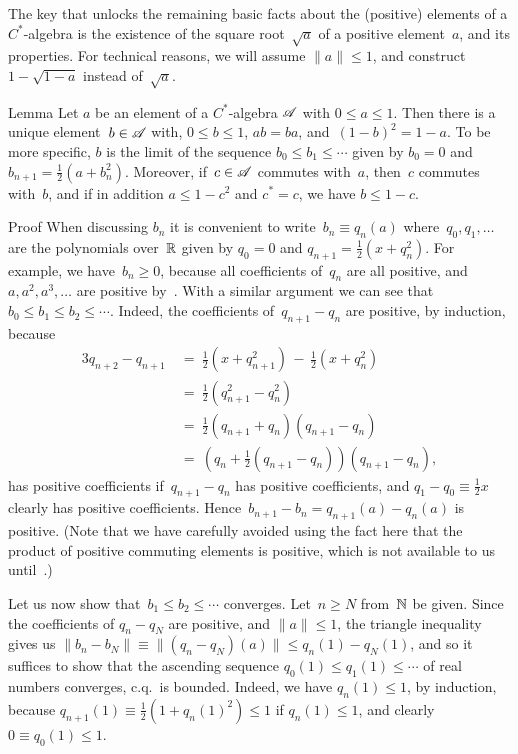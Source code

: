 \documentclass[main]{subfiles}
\begin{document}
\begin{parsec}%
\begin{point}%
The key that unlocks the remaining basic facts 
about the (positive) elements of a  $C^*$-algebra
is the existence of the square root~$\sqrt{a}$ of a positive element~$a$,
and its properties.
For technical reasons,
we will assume $\|a\|\leq 1$,
and construct
 $1-\sqrt{1-a}$ instead of~$\sqrt{a}$.
\end{point}
\begin{point}{Lemma}%
Let $a$ be an element of a $C^*$-algebra $\mathscr{A}$
with $0\leq a\leq 1$.
Then there is a unique element~$b\in\mathscr{A}$ 
with, $0\leq b\leq 1$,
$ab=ba$,
and~$(1-b)^2 = 1-a$.
To be more specific,
$b$ is the limit of
the sequence $b_0\leq b_1\leq \dotsb$
given by $b_0=0$ and $b_{n+1} = \frac{1}{2}(a+b_n^2)$.
Moreover,
if~$c\in\mathscr{A}$ commutes with~$a$, then~$c$ commutes with~$b$,
and if in addition $a\leq 1-c^2$ and $c^*=c$,
we have $b\leq 1-c$.
\begin{point}{Proof}%
When discussing $b_n$ it 
is convenient to write~$b_n \equiv q_n(a)$
where~$q_0,q_1,\dotsc$ are the polynomials over~$\mathbb{R}$ given by
$q_0=0$ and $q_{n+1}=\frac{1}{2}(x + q_n^2)$.
For example,
we have~$b_n\geq 0$, 
because all coefficients of~$q_n$ are all positive,
and $a,a^2,a^3,\dotsc$ are positive by~.
With a similar argument we can see that
 $b_0 \leq b_1\leq b_2\leq \dotsb$.
Indeed, 
the coefficients of~$q_{n+1}-q_n$
are positive,
by induction,
because
\begin{alignat*}{3}
q_{n+2}-q_{n+1} \ &=\ \textstyle \frac{1}{2}(x+ q_{n+1}^2)
\,-\, \textstyle\frac{1}{2}(x+q_n^2) \\
&=\ \textstyle\frac{1}{2}(q_{n+1}^2- q_n^2) \\
&=\ \textstyle\frac{1}{2}(q_{n+1}+q_n)(q_{n+1}-q_n) \\
&=\ (q_n+\textstyle\frac{1}{2}(q_{n+1}-q_n))(q_{n+1}-q_n),
\end{alignat*}
has positive coefficients
if~$q_{n+1}-q_n$ has positive coefficients,
and $q_1-q_0\equiv \frac{1}{2}x$ clearly has positive coefficients.
Hence~$b_{n+1}-b_{n} = q_{n+1}(a)- q_n(a)$ is positive.
(Note that we have carefully avoided
using the fact here that the product of positive 
commuting elements is positive,
which is not available to us until~.)

Let us now show that~$b_1\leq b_2\leq \dotsb$ converges.
Let~$n\geq N$ from~$\mathbb{N}$ be given.
Since the coefficients of $q_n-q_N$ are positive,
and $\|a\|\leq 1$,
the triangle inequality gives us
$\|b_n-b_N\|\equiv \|(q_n-q_N)(a)\|\leq q_n(1)-q_N(1)$,
and
so it suffices to 
show that the ascending sequence
 $q_0(1)\leq q_1(1)\leq \dotsb$
of real numbers
converges,
c.q.~is bounded.
Indeed,
we have $q_n(1)\leq 1$,
by induction,
because $q_{n+1}(1)\equiv \frac{1}{2}(1+q_n(1)^2)
\leq 1$ if $q_n(1)\leq 1$,
and clearly $0\equiv q_0(1)\leq 1$.


\end{point}
\end{point}
\end{parsec}
\end{document}
